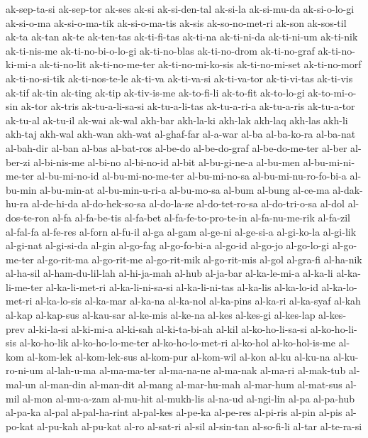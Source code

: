 {ak-sep-ta-si ak-sep-tor ak-ses ak-si ak-si-den-tal ak-si-la ak-si-mu-da
ak-si-o-lo-gi ak-si-o-ma ak-si-o-ma-tik ak-si-o-ma-tis ak-sis
ak-so-no-met-ri ak-son ak-sos-til ak-ta ak-tan ak-te ak-ten-tas
ak-ti-fi-tas ak-ti-na ak-ti-ni-da ak-ti-ni-um ak-ti-nik ak-ti-nis-me
ak-ti-no-bi-o-lo-gi ak-ti-no-blas ak-ti-no-drom ak-ti-no-graf
ak-ti-no-ki-mi-a ak-ti-no-lit ak-ti-no-me-ter ak-ti-no-mi-ko-sis
ak-ti-no-mi-set ak-ti-no-morf ak-ti-no-si-tik ak-ti-nos-te-le ak-ti-va
ak-ti-va-si ak-ti-va-tor ak-ti-vi-tas ak-ti-vis ak-tif ak-tin ak-ting
ak-tip ak-tiv-is-me ak-to-fi-li ak-to-fit ak-to-lo-gi ak-to-mi-o-sin
ak-tor ak-tris ak-tu-a-li-sa-si ak-tu-a-li-tas ak-tu-a-ri-a ak-tu-a-ris
ak-tu-a-tor ak-tu-al ak-tu-il ak-wai ak-wal akh-bar akh-la-ki akh-lak
akh-laq akh-las akh-li akh-taj akh-wal akh-wan akh-wat al-ghaf-far
al-a-war al-ba al-ba-ko-ra al-ba-nat al-bah-dir al-ban al-bas al-bat-ros
al-be-do al-be-do-graf al-be-do-me-ter al-ber al-ber-zi al-bi-nis-me
al-bi-no al-bi-no-id al-bit al-bu-gi-ne-a al-bu-men al-bu-mi-ni-me-ter
al-bu-mi-no-id al-bu-mi-no-me-ter al-bu-mi-no-sa al-bu-mi-nu-ro-fo-bi-a
al-bu-min al-bu-min-at al-bu-min-u-ri-a al-bu-mo-sa al-bum al-bung
al-ce-ma al-dak-hu-ra al-de-hi-da al-do-hek-so-sa al-do-la-se
al-do-tet-ro-sa al-do-tri-o-sa al-dol al-dos-te-ron al-fa al-fa-be-tis
al-fa-bet al-fa-fe-to-pro-te-in al-fa-nu-me-rik al-fa-zil al-fal-fa
al-fe-res al-forn al-fu-il al-ga al-gam al-ge-ni al-ge-si-a al-gi-ko-la
al-gi-lik al-gi-nat al-gi-si-da al-gin al-go-fag al-go-fo-bi-a al-go-id
al-go-jo al-go-lo-gi al-go-me-ter al-go-rit-ma al-go-rit-me al-go-rit-mik
al-go-rit-mis al-gol al-gra-fi al-ha-nik al-ha-sil al-ham-du-lil-lah
al-hi-ja-mah al-hub al-ja-bar al-ka-le-mi-a al-ka-li al-ka-li-me-ter
al-ka-li-met-ri al-ka-li-ni-sa-si al-ka-li-ni-tas al-ka-lis al-ka-lo-id
al-ka-lo-met-ri al-ka-lo-sis al-ka-mar al-ka-na al-ka-nol al-ka-pins
al-ka-ri al-ka-syaf al-kah al-kap al-kap-sus al-kau-sar al-ke-mis al-ke-na
al-kes al-kes-gi al-kes-lap al-kes-prev al-ki-la-si al-ki-mi-a al-ki-sah
al-ki-ta-bi-ah al-kil al-ko-ho-li-sa-si al-ko-ho-li-sis al-ko-ho-lik
al-ko-ho-lo-me-ter al-ko-ho-lo-met-ri al-ko-hol al-ko-hol-is-me al-kom
al-kom-lek al-kom-lek-sus al-kom-pur al-kom-wil al-kon al-ku al-ku-na
al-ku-ro-ni-um al-lah-u-ma al-ma-ma-ter al-ma-na-ne al-ma-nak al-ma-ri
al-mak-tub al-mal-un al-man-din al-man-dit al-mang al-mar-hu-mah
al-mar-hum al-mat-sus al-mil al-mon al-mu-a-zam al-mu-hit al-mukh-lis
al-na-ud al-ngi-lin al-pa al-pa-hub al-pa-ka al-pal al-pal-ha-rint
al-pal-kes al-pe-ka al-pe-res al-pi-ris al-pin al-pis al-po-kat al-pu-kah
al-pu-kat al-ro al-sat-ri al-sil al-sin-tan al-so-fi-li al-tar al-te-ra-si
}
